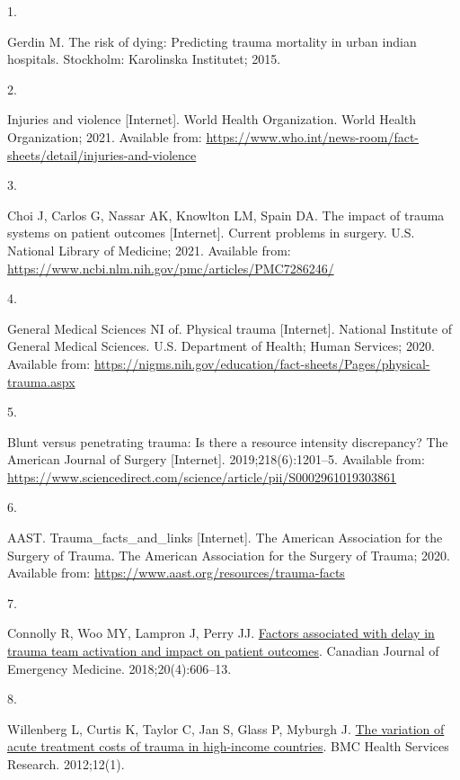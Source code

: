 \documentclass[
]{article}
\newlength{\cslhangindent}
\newlength{\csllabelwidth}
\newlength{\cslentryspacingunit} %
\newenvironment{CSLReferences}[2] %
 {%
  \setlength{\parindent}{0pt}
  \ifodd #1
  \let\oldpar\par
  \def\par{\hangindent=\cslhangindent\oldpar}
  \fi
  \setlength{\parskip}{#2\cslentryspacingunit}
 }%
 {}
\newcommand{\CSLLeftMargin}[1]{\parbox[t]{\csllabelwidth}{#1}}
\newcommand{\CSLRightInline}[1]{\parbox[t]{\linewidth - \csllabelwidth}{#1}\break}
\begin{document}
\hypertarget{refs}{}
\begin{CSLReferences}{0}{0}
\leavevmode{}%
\CSLLeftMargin{1. }%
\CSLRightInline{Gerdin M. The risk of dying: Predicting trauma mortality
in urban indian hospitals. Stockholm: Karolinska Institutet; 2015. }

\leavevmode{}%
\CSLLeftMargin{2. }%
\CSLRightInline{Injuries and violence {[}Internet{]}. World Health
Organization. World Health Organization; 2021. Available from:
\url{https://www.who.int/news-room/fact-sheets/detail/injuries-and-violence}}

\leavevmode{}%
\CSLLeftMargin{3. }%
\CSLRightInline{Choi J, Carlos G, Nassar AK, Knowlton LM, Spain DA. The
impact of trauma systems on patient outcomes {[}Internet{]}. Current
problems in surgery. U.S. National Library of Medicine; 2021. Available
from: \url{https://www.ncbi.nlm.nih.gov/pmc/articles/PMC7286246/}}

\leavevmode{}%
\CSLLeftMargin{4. }%
\CSLRightInline{General Medical Sciences NI of. Physical trauma
{[}Internet{]}. National Institute of General Medical Sciences. U.S.
Department of Health; Human Services; 2020. Available from:
\url{https://nigms.nih.gov/education/fact-sheets/Pages/physical-trauma.aspx}}

\leavevmode{}%
\CSLLeftMargin{5. }%
\CSLRightInline{Blunt versus penetrating trauma: Is there a resource
intensity discrepancy? The American Journal of Surgery {[}Internet{]}.
2019;218(6):1201--5. Available from:
\url{https://www.sciencedirect.com/science/article/pii/S0002961019303861}}

\leavevmode{}%
\CSLLeftMargin{6. }%
\CSLRightInline{AAST. Trauma\_facts\_and\_links {[}Internet{]}. The
American Association for the Surgery of Trauma. The American Association
for the Surgery of Trauma; 2020. Available from:
\url{https://www.aast.org/resources/trauma-facts}}

\leavevmode{}%
\CSLLeftMargin{7. }%
\CSLRightInline{Connolly R, Woo MY, Lampron J, Perry JJ.
\href{https://doi.org/10.1017/cem.2017.389}{Factors associated with
delay in trauma team activation and impact on patient outcomes}.
Canadian Journal of Emergency Medicine. 2018;20(4):606--13. }

\leavevmode{}%
\CSLLeftMargin{8. }%
\CSLRightInline{Willenberg L, Curtis K, Taylor C, Jan S, Glass P,
Myburgh J. \href{https://doi.org/10.1186/1472-6963-12-267}{The variation
of acute treatment costs of trauma in high-income countries}. BMC Health
Services Research. 2012;12(1). }


\end{CSLReferences}
\end{document}
